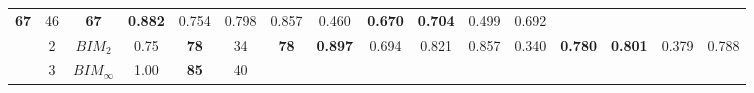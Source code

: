 \begin{table}[tph]
\begin{adjustbox}{angle=90}
{\begin{tabular}{c|c|cc|ccc|ccc|ccc|ccc}
                \textbf{67}
                                                                        & 46                             &
                \textbf{67}
                                                                        &
                \textbf{0.882}
                                                                        & 0.754
                                                                        & 0.798
                                                                        & 0.857
                                                                        & 0.460
                                                                        &
                \textbf{0.670}
                                                                        &
                \textbf{0.704}
                                                                        & 0.499
                                                                        & 0.692
                \\
                                                                        & 2
                                                                        & $BIM_{2}$                      & 0.75
                                                                        &
                \textbf{78}
                                                                        & 34
                                                                        &
                \textbf{78}
                                                                        &
                \textbf{0.897}
                                                                        & 0.694
                                                                        & 0.821                          &
                0.857                                                   & 0.340
                                                                        &
                \textbf{0.780}
                                                                        &
                \textbf{0.801}
                                                                        & 0.379
                                                                        & 0.788
                \\
                                                                        & 3
                                                                        & $BIM_{\infty}$                 & 1.00 &
                \textbf{85}
                                                                        & 40
                                                                        &

\end{tabular}}
\end{adjustbox}
\end{table}
